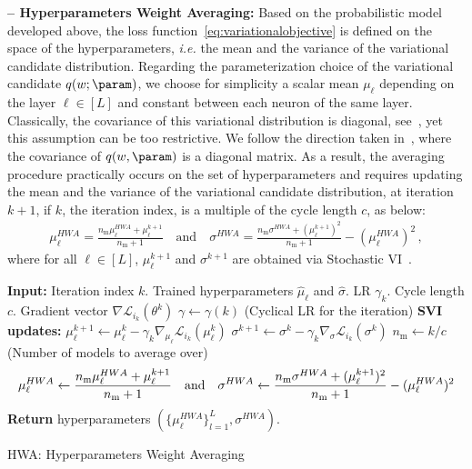 \documentclass[tablecaption=bottom,wcp]{jmlr} %
\begin{document}
\textbf{-- Hyperparameters Weight Averaging:}
Based on the probabilistic model developed above, the loss function~\eqref{eq:variationalobjective} is defined on the space of the hyperparameters, \textit{i.e.} the mean and the variance of the variational candidate distribution.
Regarding the parameterization choice of the variational candidate $q( w; \param )$, we choose for simplicity a scalar mean $\mu_{\ell}$ depending on the layer $\ell \in [L]$ and constant between each neuron of the same layer. 
Classically, the covariance of this variational distribution is diagonal, see~\citep{kirkpatrick2017overcoming, blundell2015weight}, yet this assumption can be too restrictive.
We follow the direction taken in~\citep{maddox2019simple}, where the covariance of $q(w, \param)$ is a diagonal matrix.
As a result, the averaging procedure practically occurs on the set of hyperparameters and requires updating the mean and the variance of the variational candidate distribution, at iteration $k+1$, if $k$, the iteration index, is a multiple of the cycle length $c$,  as below:
\begin{equation}\label{eq:hwa_updates}
\begin{split}
 \mu_{\ell}^{HWA}  =  \frac{n_{\textrm{m}}\mu_{\ell}^{HWA} + \mu_{\ell}^{k+1}}{n_{\textrm{m}}+1}  \quad \textrm{and} \quad  \sigma^{HWA}   =  \frac{n_{\textrm{m}}\sigma^{HWA} + (\mu_{\ell}^{k+1})^2}{n_{\textrm{m}}+1} -( \mu_{\ell}^{HWA})^2 \, ,
\end{split}
\end{equation}
where for all $\ell \in [L]$, $\mu_{\ell}^{k+1}$ and $\sigma^{k+1}$ are obtained via Stochastic VI~\citep{hoffman2013stochastic}.


\begin{algorithm}[H]
\begin{algorithmic}[1]
\STATE \textbf{Input:} Iteration index $k$. Trained hyperparameters $\hat{\mu}_{\ell}$ and $\hat{\sigma}$. LR $\gamma_k$. Cycle length $c$. Gradient vector $\nabla \mathcal{L}_{i_{k}}(\theta^{k})$
\STATE $\gamma \leftarrow \gamma(k)$ (Cyclical LR for the iteration)
\STATE \textbf{SVI updates:}
\STATE \quad $\mu_{\ell}^{k+1} \leftarrow \mu_{\ell}^{k} - \gamma_k \nabla_{\mu_{\ell}} \mathcal{L}_{i_{k}}(\mu_{\ell}^{k})$  \label{line:svi}
\STATE \quad $\sigma^{k+1} \leftarrow \sigma^{k} - \gamma_k \nabla_{\sigma} \mathcal{L}_{i_{k}}(\sigma^{k})$ \label{line:svisigma}
	\STATE \quad $n_{\textrm{m}} \leftarrow k/c$ \quad (Number of models to average over)
\begin{equation}\notag
\mu_{\ell}^{HWA} \leftarrow \frac{n_{\textrm{m}}\mu_{\ell}^{HWA} + \mu_{\ell}^{k+1}}{n_{\textrm{m}}+1} \quad \textrm{and} \quad \sigma^{HWA} \leftarrow \frac{n_{\textrm{m}}\sigma^{HWA} + (\mu_{\ell}^{k+1})^2}{n_{\textrm{m}}+1} -( \mu_{\ell}^{HWA})^2
\end{equation}
\ENDIF
\STATE \textbf{Return} hyperparameters $(\{\mu_{\ell}^{HWA}\}_{l=1}^L, \sigma^{HWA})$.
\end{algorithmic}
\caption{HWA: Hyperparameters Weight Averaging}
\label{alg:hwa}
\end{algorithm}
\end{document}
